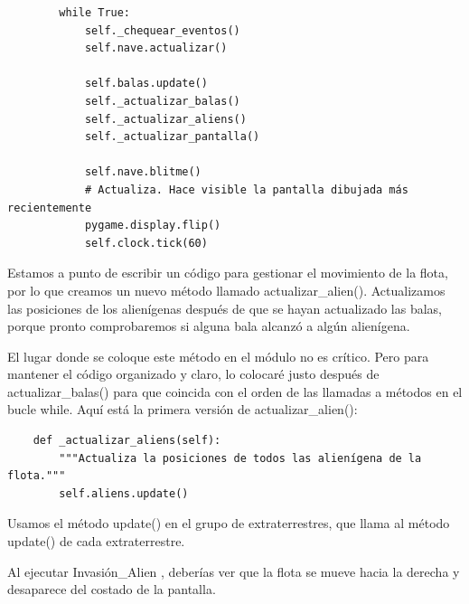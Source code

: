 \hspace{-2.4cm}{\ttfamily \scriptsize invasión}

\vspace{-0.2cm}
\hspace{-2.1cm}{\ttfamily \scriptsize \_alien.py}\vspace{-0.84cm}
\begin{lstlisting}	
        while True:
            self._chequear_eventos()            
            self.nave.actualizar()            

            self.balas.update()           
            self._actualizar_balas()
            self._actualizar_aliens()
            self._actualizar_pantalla()            

            self.nave.blitme()
            # Actualiza. Hace visible la pantalla dibujada más recientemente
            pygame.display.flip()
            self.clock.tick(60)
\end{lstlisting}

Estamos a punto de escribir un código para gestionar el movimiento de la flota, por lo que creamos un nuevo método llamado {\ttfamily actualizar\_alien()}. 
Actualizamos las posiciones de los alienígenas después de que se hayan actualizado las balas, porque pronto comprobaremos si alguna bala alcanzó a algún alienígena.

El lugar donde se coloque este método en el módulo no es crítico. Pero para mantener el código organizado y claro, lo colocaré justo después de {\ttfamily actualizar\_balas()} para que coincida con el orden de las llamadas a métodos en el bucle  {\ttfamily while}. Aquí está la primera versión de {\ttfamily actualizar\_alien()}:

\hspace{-2.4cm}{\ttfamily \scriptsize invasión}

\vspace{-0.2cm}
\hspace{-2.1cm}{\ttfamily \scriptsize \_alien.py}\vspace{-0.84cm}
\begin{lstlisting}
    def _actualizar_aliens(self):
        """Actualiza la posiciones de todos las alienígena de la flota."""
        self.aliens.update()
\end{lstlisting}


Usamos el método {\ttfamily update()}  en el grupo de extraterrestres, que llama al método {\ttfamily update()} de cada extraterrestre. 

Al  ejecutar {\ttfamily Invasión\_Alien} , deberías ver que la flota se mueve hacia la derecha y desaparece del costado de la pantalla.


